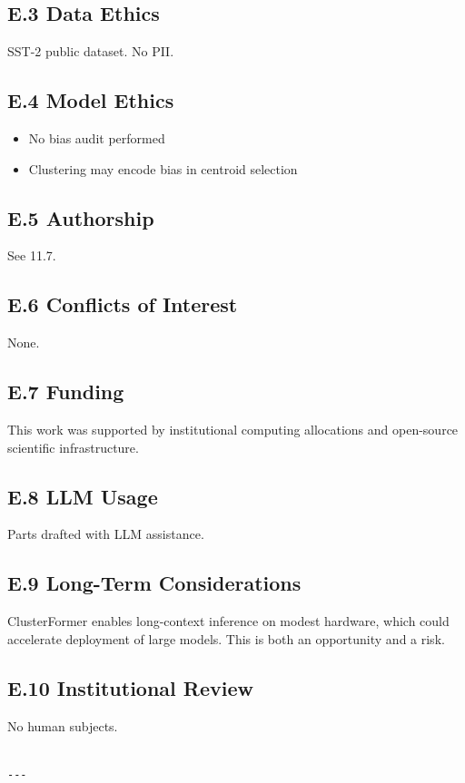 \subsection{E.3 Data Ethics}

SST-2 public dataset. No PII.

\subsection{E.4 Model Ethics}

\begin{itemize}
\item No bias audit performed
\item Clustering may encode bias in centroid selection

\end{itemize}
\subsection{E.5 Authorship}

See  11.7.

\subsection{E.6 Conflicts of Interest}

None.

\subsection{E.7 Funding}

This work was supported by institutional computing allocations and open-source scientific infrastructure.

\subsection{E.8 LLM Usage}

Parts drafted with LLM assistance.

\subsection{E.9 Long-Term Considerations}

ClusterFormer enables long-context inference on modest hardware, which 
could accelerate deployment of large models. This is both an opportunity 
and a risk.

\subsection{E.10 Institutional Review}

No human subjects.
\begin{lstlisting}

---
\end{lstlisting}